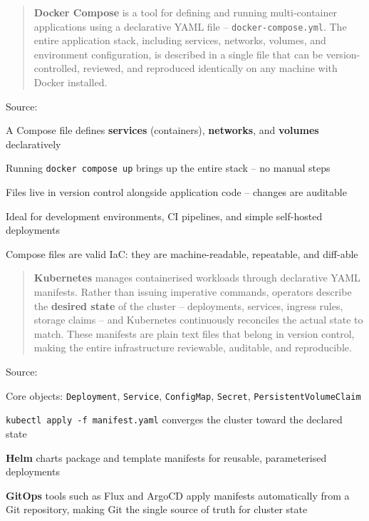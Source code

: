 \documentclass[Screen16to9,17pt]{foils}
\begin{document}


\begin{quote}
{\bf Docker Compose} is a tool for defining and running multi-container applications
using a declarative YAML file -- \verb+docker-compose.yml+. The entire application stack,
including services, networks, volumes, and environment configuration, is described
in a single file that can be version-controlled, reviewed, and reproduced identically
on any machine with Docker installed.
\end{quote}

Source: {\footnotesize
{}}

\begin{list2}
\item A Compose file defines {\bf services} (containers), {\bf networks}, and {\bf volumes} declaratively
\item Running \verb+docker compose up+ brings up the entire stack -- no manual steps
\item Files live in version control alongside application code -- changes are auditable
\item Ideal for development environments, CI pipelines, and simple self-hosted deployments
\item Compose files are valid IaC: they are machine-readable, repeatable, and diff-able
\end{list2}




\begin{quote}
{\bf Kubernetes} manages containerised workloads through declarative YAML manifests.
Rather than issuing imperative commands, operators describe the {\bf desired state}
of the cluster -- deployments, services, ingress rules, storage claims -- and
Kubernetes continuously reconciles the actual state to match. These manifests
are plain text files that belong in version control, making the entire
infrastructure reviewable, auditable, and reproducible.
\end{quote}

Source: {\footnotesize
{}}

\begin{list2}
\item Core objects: \verb+Deployment+, \verb+Service+, \verb+ConfigMap+, \verb+Secret+, \verb+PersistentVolumeClaim+
\item \verb+kubectl apply -f manifest.yaml+ converges the cluster toward the declared state
\item {\bf Helm} charts package and template manifests for reusable, parameterised deployments 
\item {\bf GitOps} tools such as Flux and ArgoCD apply manifests automatically from a Git repository,
making Git the single source of truth for cluster state
\end{list2}
\end{document}
